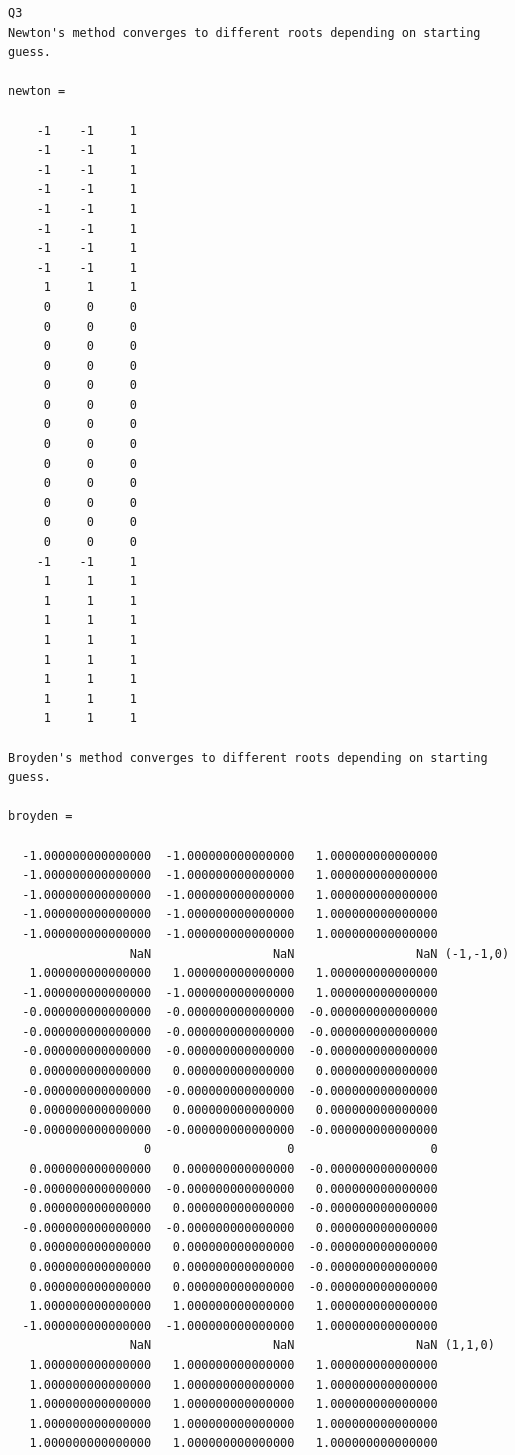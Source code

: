 \documentclass[11pt]{amsart}
\begin{document}
\begin{lstlisting}
Q3
Newton's method converges to different roots depending on starting guess.

newton =

    -1    -1     1
    -1    -1     1
    -1    -1     1
    -1    -1     1
    -1    -1     1
    -1    -1     1
    -1    -1     1
    -1    -1     1
     1     1     1
     0     0     0
     0     0     0
     0     0     0
     0     0     0
     0     0     0
     0     0     0
     0     0     0
     0     0     0
     0     0     0
     0     0     0
     0     0     0
     0     0     0
     0     0     0
    -1    -1     1
     1     1     1
     1     1     1
     1     1     1
     1     1     1
     1     1     1
     1     1     1
     1     1     1
     1     1     1

Broyden's method converges to different roots depending on starting guess.

broyden =

  -1.000000000000000  -1.000000000000000   1.000000000000000
  -1.000000000000000  -1.000000000000000   1.000000000000000
  -1.000000000000000  -1.000000000000000   1.000000000000000
  -1.000000000000000  -1.000000000000000   1.000000000000000
  -1.000000000000000  -1.000000000000000   1.000000000000000
                 NaN                 NaN                 NaN (-1,-1,0)
   1.000000000000000   1.000000000000000   1.000000000000000
  -1.000000000000000  -1.000000000000000   1.000000000000000
  -0.000000000000000  -0.000000000000000  -0.000000000000000
  -0.000000000000000  -0.000000000000000  -0.000000000000000
  -0.000000000000000  -0.000000000000000  -0.000000000000000
   0.000000000000000   0.000000000000000   0.000000000000000
  -0.000000000000000  -0.000000000000000  -0.000000000000000
   0.000000000000000   0.000000000000000   0.000000000000000
  -0.000000000000000  -0.000000000000000  -0.000000000000000
                   0                   0                   0
   0.000000000000000   0.000000000000000  -0.000000000000000
  -0.000000000000000  -0.000000000000000   0.000000000000000
   0.000000000000000   0.000000000000000  -0.000000000000000
  -0.000000000000000  -0.000000000000000   0.000000000000000
   0.000000000000000   0.000000000000000  -0.000000000000000
   0.000000000000000   0.000000000000000  -0.000000000000000
   0.000000000000000   0.000000000000000  -0.000000000000000
   1.000000000000000   1.000000000000000   1.000000000000000
  -1.000000000000000  -1.000000000000000   1.000000000000000
                 NaN                 NaN                 NaN (1,1,0)
   1.000000000000000   1.000000000000000   1.000000000000000
   1.000000000000000   1.000000000000000   1.000000000000000
   1.000000000000000   1.000000000000000   1.000000000000000
   1.000000000000000   1.000000000000000   1.000000000000000
   1.000000000000000   1.000000000000000   1.000000000000000


\end{lstlisting}
\end{document}

